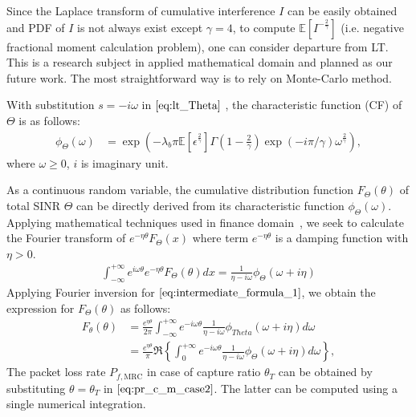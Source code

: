 Since the Laplace transform of cumulative interference $I$ can be easily obtained and PDF of $I$ is not always exist except $\gamma=4$, to compute $\mathbb{E}\left[ I ^{-\frac{2}{\gamma}}\right]$ (i.e. negative fractional moment calculation problem), one can consider departure from LT. This is a research subject in applied mathematical domain and planned as our future work. The most straightforward way is to rely on Monte-Carlo method.

With substitution $s = -i \omega$ in $\eqref{eq:lt_Theta}$ , the characteristic function (CF) of $\Theta$ is as follows:
\begin{align}
\phi_{\Theta}\left( \omega \right) &= \exp(-\lambda_{b} \pi \mathbb{E}\left[ \epsilon ^{\frac{2}{\gamma}} \right]  \Gamma(1-\frac{2}{\gamma}) \exp(-i\pi/\gamma) \omega^{\frac{2}{\gamma}}),  
\end{align}
where $\omega \geq 0$, $i$ is imaginary unit.

As a continuous random variable, the cumulative distribution function $F_{\Theta}\left( \theta \right)$ of total SINR $\Theta$ can be directly derived from its characteristic function $\phi_{\Theta}\left(\omega\right)$. Applying mathematical techniques used in finance domain~\cite{hirsa2012computational}, we seek to calculate the Fourier transform of $e^{-\eta \theta} F_{\Theta}\left( x \right)$ where term $e^{-\eta \theta}$ is a damping function with $\eta > 0$. 
\begin{align}
\label{eq:intermediate_formula_1}
\int_{-\infty}^{+\infty} e^{i\omega \theta} e^{-\eta \theta} F_{\Theta}\left( \theta \right) dx = \frac{1}{\eta - i\omega} \phi_{\Theta}\left( \omega +i\eta \right) 
\end{align}
Applying Fourier inversion for $\eqref{eq:intermediate_formula_1}$, we obtain the expression for $F_{\Theta}\left( \theta \right)$ as follows:
\begin{align}
\label{eq:pr_c_m_case2}
F_{\theta}\left( \theta \right)  &= \frac{e^{\eta \theta}}{2\pi} \int_{-\infty}^{+\infty} e^{-i \omega \theta} \frac{1}{\eta - i\omega} \phi_{Theta}\left( \omega +i\eta\right) d\omega  \nonumber\\
&= \frac{e^{\eta \theta}}{\pi} \Re\left\lbrace  \int_{0}^{+\infty} e^{-i \omega \theta} \frac{1}{\eta - i\omega} \phi_{\Theta}\left( \omega +i\eta\right) d\omega\right\rbrace, 
\end{align}
The packet loss rate $P_{f,\text{MRC}}$ in case of capture ratio $\theta_{T}$ can be obtained by substituting $\theta = \theta_{T}$ in $\eqref{eq:pr_c_m_case2}$. The latter can be computed using a single numerical integration.


